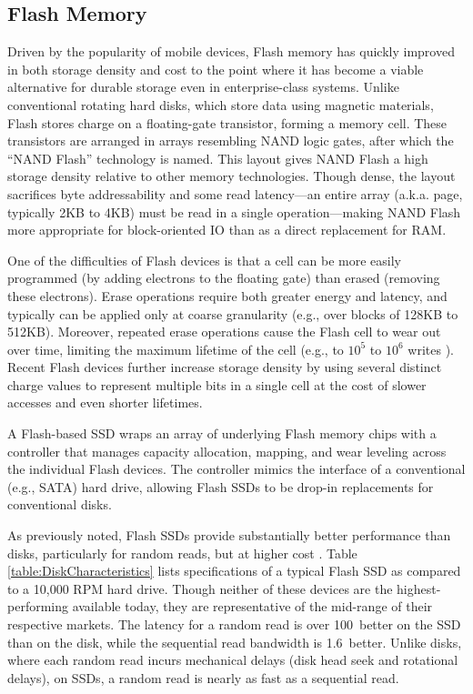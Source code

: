 \subsection{Flash Memory}
\label{sec:Background:Storage:Flash}
Driven by the popularity of mobile devices, Flash memory has quickly improved in both storage density and cost to the point where it has become a viable alternative for durable storage even in enterprise-class systems.
Unlike conventional rotating hard disks, which store data using magnetic materials, Flash stores charge on a floating-gate transistor, forming a memory cell.
These transistors are arranged in arrays resembling NAND logic gates, after which the ``NAND Flash'' technology is named.
This layout gives NAND Flash a high storage density relative to other memory technologies.
Though dense, the layout sacrifices byte addressability and some read latency---an entire array (a.k.a. page, typically 2KB to 4KB) must be read in a single operation---making NAND Flash more appropriate for block-oriented IO than as a direct replacement for RAM.  

One of the difficulties of Flash devices is that a cell can be more easily programmed (by adding electrons to the floating gate) than erased (removing these electrons).  
Erase operations require both greater energy and latency, and typically can be applied only at coarse granularity (e.g., over blocks of 128KB to 512KB).
Moreover, repeated erase operations cause the Flash cell to wear out over time, limiting the maximum lifetime of the cell (e.g., to $10^5$ to $10^6$ writes \cite{Roberts2009}).  
Recent Flash devices further increase storage density by using several distinct charge values to represent multiple bits in a single cell at the cost of slower accesses and even shorter lifetimes.

A Flash-based SSD wraps an array of underlying Flash memory chips with a controller that manages capacity allocation, mapping, and wear leveling across the individual Flash devices.  
The controller mimics the interface of a conventional (e.g., SATA) hard drive, allowing Flash SSDs to be drop-in replacements for conventional disks.
      
As previously noted, Flash SSDs provide substantially better performance than disks, particularly for random reads, but at higher cost \cite{BoboilaDesoyers11}.
Table \ref{table:DiskCharacteristics} lists specifications of a typical Flash SSD as compared to a 10,000 RPM hard drive.
Though neither of these devices are the highest-performing available today, they are representative of the mid-range of their respective markets.
The latency for a random read is over 100\texttimes~better on the SSD than on the disk, while the sequential read bandwidth is 1.6\texttimes~better. 
Unlike disks, where each random read incurs mechanical delays (disk head seek and rotational delays), on SSDs, a random read is nearly as fast as a sequential read.  


